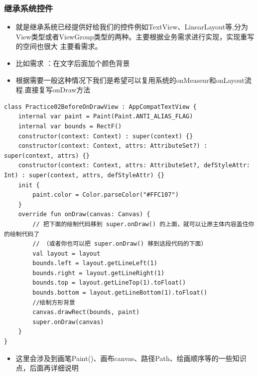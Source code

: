 \documentclass[9pt, b5paper]{article}
\begin{document}
\subsubsection{继承系统控件}
\label{sec-1-3-2}
\begin{itemize}
\item 就是继承系统已经提供好给我们的控件例如TextView、LinearLayout等,分为View类型或者ViewGroup类型的两种。主要根据业务需求进行实现，实现重写的空间也很大 主要看需求。
\item 比如需求 ：在文字后面加个颜色背景
\item 根据需要一般这种情况下我们是希望可以复用系统的onMeaseur和onLayout流程.直接复写onDraw方法
\end{itemize}
\begin{verbatim}
class Practice02BeforeOnDrawView : AppCompatTextView {
    internal var paint = Paint(Paint.ANTI_ALIAS_FLAG)
    internal var bounds = RectF()
    constructor(context: Context) : super(context) {}
    constructor(context: Context, attrs: AttributeSet?) : super(context, attrs) {}
    constructor(context: Context, attrs: AttributeSet?, defStyleAttr: Int) : super(context, attrs, defStyleAttr) {}
    init {
        paint.color = Color.parseColor("#FFC107")
    }
    override fun onDraw(canvas: Canvas) {
        // 把下面的绘制代码移到 super.onDraw() 的上面，就可以让原主体内容盖住你的绘制代码了
        // （或者你也可以把 super.onDraw() 移到这段代码的下面）
        val layout = layout
        bounds.left = layout.getLineLeft(1)
        bounds.right = layout.getLineRight(1)
        bounds.top = layout.getLineTop(1).toFloat()
        bounds.bottom = layout.getLineBottom(1).toFloat()
        //绘制方形背景
        canvas.drawRect(bounds, paint)
        super.onDraw(canvas)
    }
}
\end{verbatim}
\begin{itemize}
\item 这里会涉及到画笔Paint()、画布canvas、路径Path、绘画顺序等的一些知识点，后面再详细说明
\end{itemize}
\end{document}
